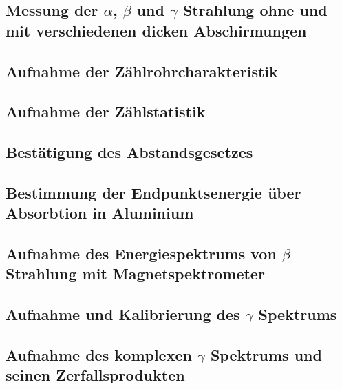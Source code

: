 \documentclass[12pt,english,ngerman]{scrartcl}
\begin{document}
\subsection{Messung der \texorpdfstring{$\alpha$}{alpha}, \texorpdfstring{$\beta$}{beta} und \texorpdfstring{$\gamma$}{gamma} Strahlung ohne und mit verschiedenen dicken Abschirmungen}



\subsection{Aufnahme der Zählrohrcharakteristik}




\subsection{Aufnahme der Zählstatistik}


\subsection{Bestätigung des Abstandsgesetzes}


\subsection{Bestimmung der Endpunktsenergie über Absorbtion in Aluminium}


\subsection{Aufnahme des Energiespektrums von \texorpdfstring{$\beta$}{beta} Strahlung mit Magnetspektrometer}


\subsection{Aufnahme und Kalibrierung des \texorpdfstring{$\gamma$}{gamma} Spektrums}


\subsection{Aufnahme des komplexen \texorpdfstring{$\gamma$}{gamma} Spektrums und seinen Zerfallsprodukten}



\newpage

\printbibliography
\listoffigures
\listoftables
\end{document}
